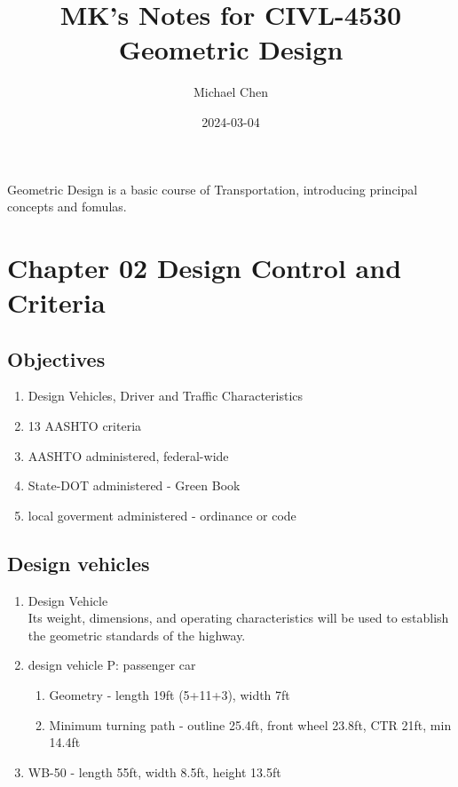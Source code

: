 \documentclass{article}
\title{MK's Notes for CIVL-4530 Geometric Design}
\date{2024-03-04}
\author{Michael Chen}
\begin{document}
  \maketitle
  \newpage


  \tableofcontents
  \newpage


  Geometric Design is a basic course of Transportation, introducing principal concepts and fomulas.

  \newpage

  \setcounter{section}{1}
  \section{Chapter 02 Design Control and Criteria}
  \subsection{Objectives}
  \begin{enumerate}
    \item Design Vehicles, Driver and Traffic Characteristics
    \item 13 AASHTO criteria
    \item AASHTO administered, federal-wide
    \item State-DOT administered - Green Book
    \item local goverment administered - ordinance or code
  \end{enumerate}

  \subsection{Design vehicles}
  \begin{enumerate}
    \item Design Vehicle\\ 
    Its weight, dimensions, and operating characteristics will be used to establish the geometric standards of the highway.
    \item design vehicle P: passenger car
    \begin{enumerate}
      \item Geometry - length 19ft (5+11+3), width 7ft
      \item Minimum turning path - outline 25.4ft, front wheel 23.8ft, CTR 21ft, min 14.4ft 
    \end{enumerate}
    \item WB-50 - length 55ft, width 8.5ft, height 13.5ft
  \end{enumerate}
\end{document}
